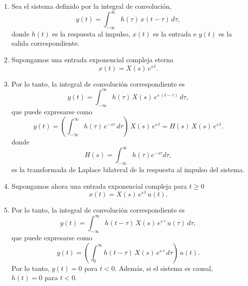 \begin{enumerate}
	\item Sea el sistema definido por la integral de convoluci\'{o}n, 
	\begin{equation}
		y\left( t\right) =
		\int_{-\infty }^{\infty }h\left( \tau \right) \, x\left(t-\tau
		\right) \, d\tau ,
	\end{equation}
	donde $h\left( t\right) $ es la respuesta al impulso, $x\left( t\right) $ es la entrada e $y\left( t\right) $ es la salida correspondiente.
	
	\item Supongamos una entrada exponencial compleja eterna
	\begin{equation}
		x\left( t\right) =X(s) \, e^{s \, t}.
	\end{equation}
	
	\item Por lo tanto, la integral de convoluci\'{o}n correspondiente es 
	\begin{equation}
		y\left( t\right) =\int_{-\infty }^{\infty }h\left( \tau \right) \,
		X(s) \, e^{s \, \left(t-\tau \right) } \, d\tau ,
	\end{equation}
	que puede expresarse como 
	\begin{equation}
		y\left( t\right) =
		\left( \int_{-\infty }^{\infty }h\left( \tau\right) \, e^{-s\tau }
		\, d\tau \right) \,  X(s) \, e^{s \, t} =
		H\left( s\right) \, X(s) \, e^{s \, t}.
	\end{equation}
	donde 
	\begin{equation}
		H\left( s\right) =\int_{-\infty }^{\infty }h\left( \tau \right) e^{-s\tau}d\tau,
		\label{laplacebilateral}
	\end{equation}
	es la transformada de Laplace bilateral de la respuesta al impulso del sistema.
	
	\item Supongamos ahora una entrada exponencial compleja para $t \geq 0$
	\begin{equation}
		x\left( t\right) = X(s) \, e^{s \, t} \, u(t).
	\end{equation}
	
	\item Por lo tanto, la integral de convoluci\'{o}n correspondiente es 
	\begin{equation}
		y\left( t\right) =
		\int_{-\infty}^{\infty }h\left( t - \tau \right) \, X(s) \, e^{s \, \tau} \, u(\tau) \, d\tau ,
	\end{equation}
	que puede expresarse como 
	\begin{equation}
		y\left( t\right) =
		\left( \int_{0}^{\infty }h\left(t - \tau\right) \, X(s) \,  e^{s \, \tau} \, d\tau \right) \, u(t).
	\end{equation}
	Por lo tanto, $y(t) = 0$ para $t < 0$. Además, si el sistema es causal, $h(t) = 0$ para $t < 0$.
	

\end{enumerate}
